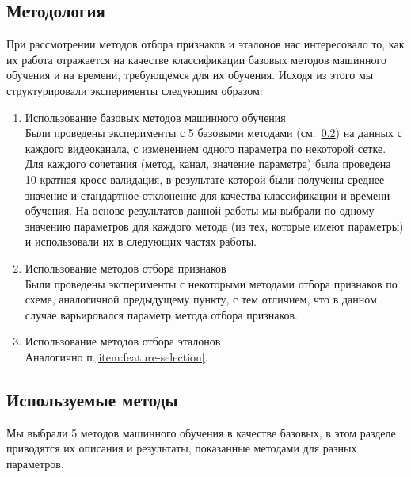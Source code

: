 \subsection{Методология}
При рассмотрении методов отбора признаков и эталонов нас интересовало то, как их работа отражается на качестве классификации базовых методов машинного обучения и на времени, требующемся для их обучения. Исходя из этого мы структурировали эксперименты следующим образом:
\begin{enumerate}
    \item Использование базовых методов машинного обучения\\
    Были проведены эксперименты с 5 базовыми методами (см.~\ref{sec:base-methods}) на данных с каждого видеоканала, с изменением одного параметра по некоторой сетке. Для каждого сочетания (метод, канал, значение параметра) была проведена 10-кратная кросс-валидация, в результате которой были получены среднее значение и стандартное отклонение для качества классификации и времени обучения. На основе результатов данной работы мы выбрали по одному значению параметров для каждого метода (из тех, которые имеют параметры) и использовали их в следующих частях работы.
    \item Использование методов отбора признаков\\\label{item:feature-selection}
    Были проведены эксперименты с некоторыми методами отбора признаков по схеме, аналогичной предыдущему пункту, с тем отличием, что в данном случае варьировался параметр метода отбора признаков.
    \item Использование методов отбора эталонов\\
    Аналогично п.\ref{item:feature-selection}.
\end{enumerate}

\subsection{Используемые методы}\label{sec:base-methods}
Мы выбрали 5 методов машинного обучения в качестве базовых, в этом разделе приводятся их описания и результаты, показанные методами для разных параметров.

